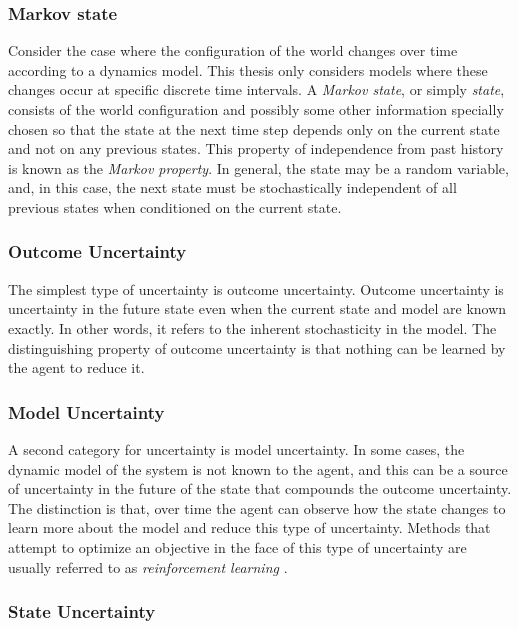 \subsubsection{Markov state}

Consider the case where the configuration of the world changes over time according to a dynamics model.
This thesis only considers models where these changes occur at specific discrete time intervals.
A \emph{Markov state}, or simply \emph{state}, consists of the world configuration and possibly some other information specially chosen so that the state at the next time step depends only on the current state and not on any previous states.
This property of independence from past history is known as the \emph{Markov property}.
In general, the state may be a random variable, and, in this case, the next state must be stochastically independent of all previous states when conditioned on the current state.

\subsubsection{Outcome Uncertainty}

The simplest type of uncertainty is outcome uncertainty.
Outcome uncertainty is uncertainty in the future state even when the current state and model are known exactly.
In other words, it refers to the inherent stochasticity in the model.
The distinguishing property of outcome uncertainty is that nothing can be learned by the agent to reduce it.

\subsubsection{Model Uncertainty}

A second category for uncertainty is model uncertainty.
In some cases, the dynamic model of the system is not known to the agent, and this can be a source of uncertainty in the future of the state that compounds the outcome uncertainty.
The distinction is that, over time the agent can observe how the state changes to learn more about the model and reduce this type of uncertainty.
Methods that attempt to optimize an objective in the face of this type of uncertainty are usually referred to as \emph{reinforcement learning} \cite{RSS-AGB:98}.

\subsubsection{State Uncertainty}

